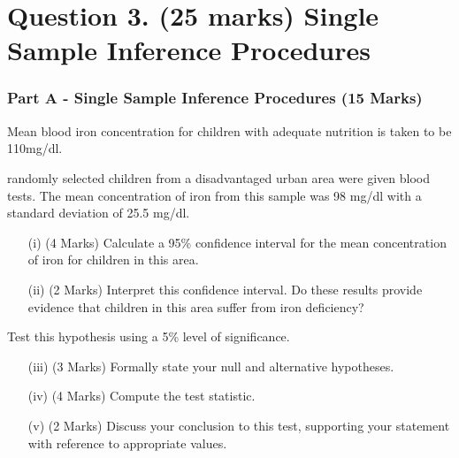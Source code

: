 \documentclass[a4paper,12pt]{article}
\begin{document}
\newpage





\newpage
\section*{Question 3. (25 marks) Single Sample Inference Procedures }
\subsubsection*{Part A - Single Sample Inference Procedures (15 Marks)}
Mean blood iron concentration for children with adequate nutrition is taken to be 110mg/dl. \\ \smallskip

 randomly selected children from a disadvantaged urban area were given blood tests. The mean concentration of iron from this sample was 98 mg/dl with a standard deviation of 25.5 mg/dl.
\begin{itemize}
	\item[(i)] (4 Marks) Calculate a 95\% confidence interval for the mean concentration of iron for children in this area. 
	\item[(ii)](2 Marks) Interpret this confidence interval.  Do these results provide evidence that children in this area suffer from iron deficiency? 
\end{itemize}
\medskip
Test this hypothesis using a 5\% level of significance. 

\begin{itemize}
	\item[(iii)](3 Marks) Formally state your null and alternative hypotheses.
	\item[(iv)](4 Marks) Compute the test statistic.
	\item[(v)](2 Marks) Discuss your conclusion to this test, supporting your statement with reference to appropriate values.
\end{itemize}
\end{document}
